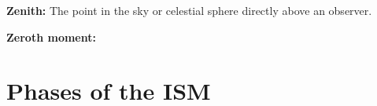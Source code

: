 \documentclass[a4paper,10pt]{article}
\begin{document}
{\noindent}\textbf{Zenith:} The point in the sky or celestial sphere directly above an observer.

{\noindent}\textbf{Zeroth moment:} 




















































\newpage
\section{Phases of the ISM}
\label{sec:ism}
\end{document}
